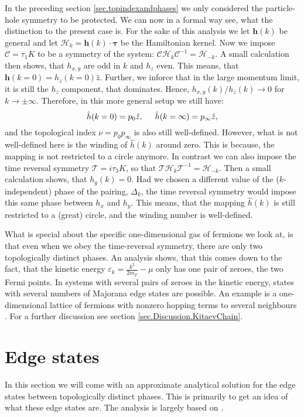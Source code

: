 In the preceding section \ref{sec.topindexandphases} we only considered the particle-hole symmetry to be protected. We can now in a formal way see, what the distinction to the present case is. For the sake of this analysis we let $\mathbf{h}(k)$ be general and let $\mathcal{H}_k = \mathbf{h}(k)\cdot \boldsymbol\tau$ be the Hamiltonian kernel. Now we impose $\mathcal{C} = \tau_1 K$ to be a symmetry of the system: $\mathcal{C}\mathcal{H}_k\mathcal{C}^{-1} = \mathcal{H}_{-k}$. A small calculation then shows, that $h_{x,y}$ are odd in $k$ and $h_z$ even. This means, that $\mathbf{h}(k = 0) = h_z(k = 0)\hat{z}$. Further, we inforce that in the large momentum limit, it is still the $h_z$ component, that dominates. Hence, $h_{x,y}(k)/h_z(k) \to 0$ for $k \to \pm \infty$. Therefore, in this more general setup we still have:
\begin{equation}
\hat{h}(k = 0) = p_0\hat{z}, \hspace{0.5cm} \hat{h}(k = \infty) = p_{\infty}\hat{z}, \nonumber
\end{equation}
and the topological index $\nu = p_0p_{\infty}$ is also still well-defined. However, what is not well-defined here is the winding of $\hat{h}(k)$ around zero. This is because, the mapping is not restricted to a circle anymore. In contrast we can also impose the time reversal symmetry $\mathcal{T} = i\tau_3 K$, so that $\mathcal{T}\mathcal{H}_k\mathcal{T}^{-1} = \mathcal{H}_{-k}$. Then a small calculation shows, that $h_y(k) = 0$. Had we chosen a different value of the ($k$-independent) phase of the pairing, $\Delta_k$, the time reversal symmetry would impose this same phase between $h_x$ and $h_y$. This means, that the mapping $\hat{h}(k)$ is still restricted to a (great) circle, and the winding number is well-defined. 

What is special about the specific one-dimensional gas of fermions we look at, is that even when we obey the time-reversal symmetry, there are only two topologically distinct phases. An analysis shows, that this comes down to the fact, that the kinetic energy $\varepsilon_k = \frac{k^2}{2m_F} - \mu$ only has one pair of zeroes, the two Fermi points. In systems with several pairs of zeroes in the kinetic energy, states with several numbers of Majorana edge states are possible. An example is a one-dimensional lattice of fermions with nonzero hopping terms to several neighbours \cite{Alecce.extendKitaev}. For a further discussion see section \ref{sec.Discussion.KitaevChain}. 
  

\section{Edge states}
\label{sec.edgestates}
In this section we will come with an approximate analytical solution for the edge states between topologically distinct phases. This is primarily to get an idea of what these edge states are. The analysis is largely based on \cite[pp. 196-198]{BernevigTITSC}. 

